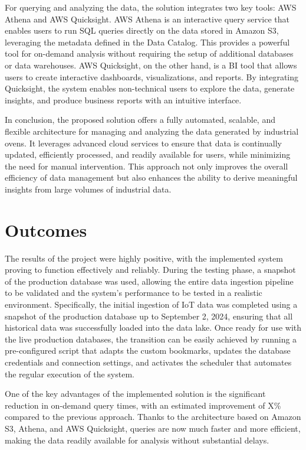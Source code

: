 For querying and analyzing the data, the solution integrates two key tools: \ac{AWS} Athena and \ac{AWS} Quicksight. \ac{AWS} Athena is an interactive query service that enables users to run \ac{SQL} queries directly on the data stored in Amazon S3, leveraging the metadata defined in the Data Catalog. This provides a powerful tool for on-demand analysis without requiring the setup of additional databases or data warehouses. \ac{AWS} Quicksight, on the other hand, is a \ac{BI} tool that allows users to create interactive dashboards, visualizations, and reports. By integrating Quicksight, the system enables non-technical users to explore the data, generate insights, and produce business reports with an intuitive interface.

In conclusion, the proposed solution offers a fully automated, scalable, and flexible architecture for managing and analyzing the data generated by industrial ovens. It leverages advanced cloud services to ensure that data is continually updated, efficiently processed, and readily available for users, while minimizing the need for manual intervention. This approach not only improves the overall efficiency of data management but also enhances the ability to derive meaningful insights from large volumes of industrial data.
\section{Outcomes}
The results of the project were highly positive, with the implemented system proving to function effectively and reliably. During the testing phase, a snapshot of the production database was used, allowing the entire data ingestion pipeline to be validated and the system's performance to be tested in a realistic environment. Specifically, the initial ingestion of \ac{IoT} data was completed using a snapshot of the production database up to September 2, 2024, ensuring that all historical data was successfully loaded into the data lake. Once ready for use with the live production databases, the transition can be easily achieved by running a pre-configured script that adapts the custom bookmarks, updates the database credentials and connection settings, and activates the scheduler that automates the regular execution of the system.

One of the key advantages of the implemented solution is the significant reduction in on-demand query times, with an estimated improvement of X\% compared to the previous approach. Thanks to the architecture based on Amazon S3, Athena, and \ac{AWS} Quicksight, queries are now much faster and more efficient, making the data readily available for analysis without substantial delays.


